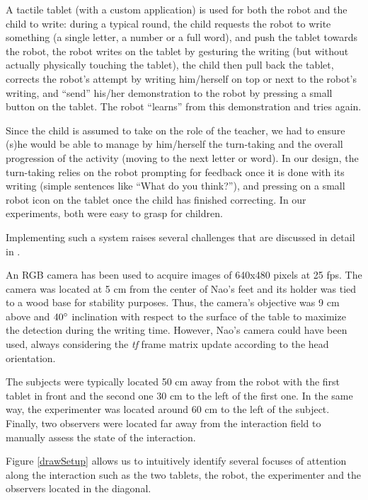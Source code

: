 \documentclass{sig-alternate}
\begin{document}
A tactile tablet (with a custom application) is used for both the robot and the child to write: during a typical round, the child requests the robot to write something (a single letter, a number or a full word), and push the tablet towards the robot, the robot writes on the tablet by gesturing the writing (but without actually physically touching the tablet), the child then pull back the
tablet, corrects the robot's attempt by writing him/herself on top or next to the robot's writing, and ``send'' his/her demonstration to the robot by pressing a small button on the tablet. The robot ``learns'' from this demonstration and tries again.

Since the child is assumed to take on the role of the teacher, we had to ensure (s)he would be able to manage by him/herself the turn-taking and the overall progression of the activity (moving to the next letter or word). In our design, the turn-taking relies on the robot prompting for feedback once it is done with its writing (simple sentences like ``What do you think?''), and pressing on a
small robot icon on the tablet once the child has finished correcting. In our experiments, both were easy to grasp for children.

Implementing such a system raises several challenges that are discussed in detail in \cite{Hood:2015}.

An RGB camera has been used to acquire images of 640x480 pixels at 25 fps. The camera was located at 5 cm from the center of Nao's feet and its holder was tied to a wood base for stability purposes. Thus, the camera's objective was 9 cm above and $ 40\degree $ inclination with respect to the surface of the table to maximize the detection during the writing time. However, Nao's camera could have been used, always considering the \textit{tf} frame matrix update according to the head orientation.

The subjects were typically located 50 cm away from the robot with the first tablet in front and the second one 30 cm to the left of the first one. In the same way, the experimenter was located around 60 cm to the left of the subject. Finally, two observers were located far away from the interaction field to manually assess the state of the interaction.

Figure \ref{drawSetup} allows us to intuitively identify several focuses of attention along the interaction such as the two tablets, the robot, the experimenter and the observers located in the diagonal.
\end{document}
